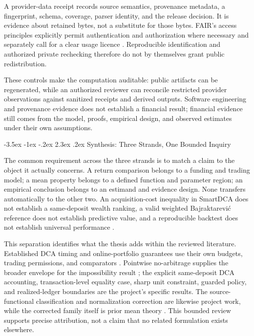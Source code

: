 \documentclass[12pt,a4paper,oneside]{report}
\makeatletter
\renewcommand\section{\@startsection{section}{1}{\z@}%
  {-3.5ex \@plus -1ex \@minus -.2ex}%
  {2.3ex \@plus .2ex}%
  {\normalfont\fontsize{14}{17}\selectfont\bfseries}}
\makeatother
\begin{document}
A provider-data receipt records source semantics, provenance metadata, a
fingerprint, schema, coverage, parser identity, and the release decision. It is
evidence about retained bytes, not a substitute for those bytes. FAIR's access
principles explicitly permit authentication and authorization where necessary
and separately call for a clear usage licence
\citep{wilkinson2016fair}. Reproducible identification and authorized private
rechecking therefore do not by themselves grant public redistribution.

These controls make the computation auditable: public artifacts can be
regenerated, while an authorized reviewer can reconcile restricted provider
observations against sanitized receipts and derived outputs. Software
engineering and provenance evidence does not establish a financial result;
financial evidence still comes from the model, proofs, empirical design, and
observed estimates under their own assumptions.

\section{Synthesis: Three Strands, One Bounded Inquiry}
\label{sec:lit-integrative-synthesis}

The common requirement across the three strands is to match a claim to the
object it actually concerns. A return comparison belongs to a funding and
trading model; a mean property belongs to a defined function and parameter
region; an empirical conclusion belongs to an estimand and evidence design.
None transfers automatically to the other two. An acquisition-cost inequality
in SmartDCA does not establish a same-deposit wealth ranking, a valid weighted
Bajraktarevi\'c reference does not establish predictive value, and a
reproducible backtest does not establish universal performance
\citep{calvet2023smartdca,paleszakaria2020,nasem2019reproducibility}.

This separation identifies what the thesis adds within the reviewed
literature. Established DCA timing and online-portfolio guarantees use their
own budgets, trading permissions, and comparators
\citep{constantinides1979,cover1991}. Pointwise no-arbitrage supplies the broader
envelope for the impossibility result \citep{burzoni2019}; the explicit
same-deposit DCA accounting, transaction-level equality case, sharp unit
constraint, guarded policy, and realized-ledger boundaries are the project's
specific results. The source-functional classification and normalization
correction are likewise project work, while the corrected family itself is
prior mean theory \citep{bajraktarevic1958,paleszakaria2020}. This bounded
review supports precise attribution, not a claim that no related formulation
exists elsewhere.
\end{document}
